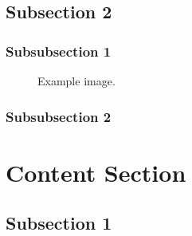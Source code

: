 \documentclass[12pt]{article} %
\begin{document}
\subsection{Subsection 2} %

\lipsum[2] %


\subsubsection{Subsubsection 1} %

\lipsum[3] %

\begin{figure}[H] %
\caption{Example image.}
\label{fig:speciation}
\end{figure}


\subsubsection{Subsubsection 2} %

\lipsum[4] %



\section{Content Section} %

\lipsum[5] %


\subsection{Subsection 1} %
\end{document}

